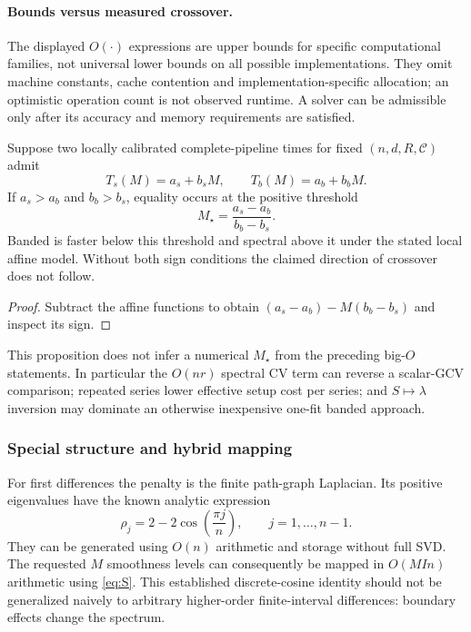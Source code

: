 \paragraph{Bounds versus measured crossover.}
The displayed $O(\cdot)$ expressions are upper bounds for specific computational families, not universal lower bounds on all possible implementations. They omit machine constants, cache contention and implementation-specific allocation; an optimistic operation count is not observed runtime. A solver can be admissible only after its accuracy and memory requirements are satisfied.

\begin{proposition}\label{prop:crossover}
Suppose two locally calibrated complete-pipeline times for fixed $(n,d,R,\mathcal C)$ admit
\begin{equation}\label{eq:affine-workload-times}
T_s(M)=a_s+b_sM,\qquad T_b(M)=a_b+b_bM.
\end{equation}
If $a_s>a_b$ and $b_b>b_s$, equality occurs at the positive threshold
\begin{equation}\label{eq:Mstar}
M_\star=\frac{a_s-a_b}{b_b-b_s}.
\end{equation}
Banded is faster below this threshold and spectral above it under the stated local affine model. Without both sign conditions the claimed direction of crossover does not follow.
\end{proposition}
\begin{proof}
Subtract the affine functions to obtain $(a_s-a_b)-M(b_b-b_s)$ and inspect its sign.
\end{proof}

This proposition does not infer a numerical $M_\star$ from the preceding big-$O$ statements. In particular the $O(nr)$ spectral CV term can reverse a scalar-GCV comparison; repeated series lower effective setup cost per series; and $S\mapsto\lambda$ inversion may dominate an otherwise inexpensive one-fit banded approach.

\subsubsection{Special structure and hybrid mapping}
For first differences the penalty is the finite path-graph Laplacian. Its positive eigenvalues have the known analytic expression
\begin{equation}\label{eq:d1spectrum}
\rho_j=2-2\cos\left(\frac{\pi j}{n}\right),
\qquad j=1,\ldots,n-1.
\end{equation}
They can be generated using $O(n)$ arithmetic and storage without full SVD. The requested $M$ smoothness levels can consequently be mapped in $O(MIn)$ arithmetic using \eqref{eq:S}. This established discrete-cosine identity should not be generalized naively to arbitrary higher-order finite-interval differences: boundary effects change the spectrum.


